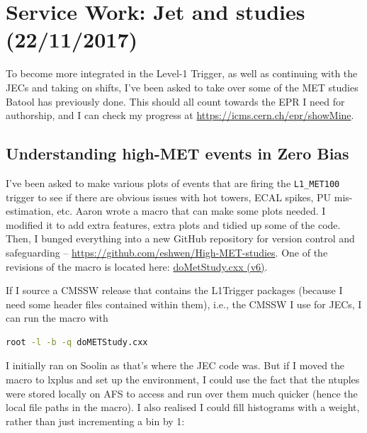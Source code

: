 
\chapter{Service Work: Jet and \texorpdfstring{\etmiss }{ETmiss} studies (22/11/2017)}

To become more integrated in the Level-1 Trigger, as well as continuing with the JECs and taking on shifts, I've been asked to take over some of the MET studies Batool has previously done. This should all count towards the EPR I need for authorship, and I can check my progress at \url{https://icms.cern.ch/epr/showMine}.

\section{Understanding high-MET events in Zero Bias}

I've been asked to make various plots of events that are firing the \texttt{L1\_MET100} trigger to see if there are obvious issues with hot towers, ECAL spikes, PU mis-estimation, etc. Aaron wrote a macro that can make some plots needed. I modified it to add extra features, extra plots and tidied up some of the code. Then, I bunged everything into a new GitHub repository for version control and safeguarding -- \url{https://github.com/eshwen/High-MET-studies}. One of the revisions of the macro is located here: \href{run:sec34/MET_studies_v6/doMetStudy.cxx}{doMetStudy.cxx (v6)}.

If I source a CMSSW release that contains the L1Trigger packages (because I need some header files contained within them), i.e., the CMSSW I use for JECs, I can run the macro with

\begin{lstlisting}[belowskip=-0.7cm, language=sh, numbers=none]
root -l -b -q doMETStudy.cxx
\end{lstlisting}

I initially ran on Soolin as that's where the JEC code was. But if I moved the macro to lxplus and set up the environment, I could use the fact that the ntuples were stored locally on AFS to access and run over them much quicker (hence the local file paths in the macro). I also realised I could fill histograms with a weight, rather than just incrementing a bin by 1:


